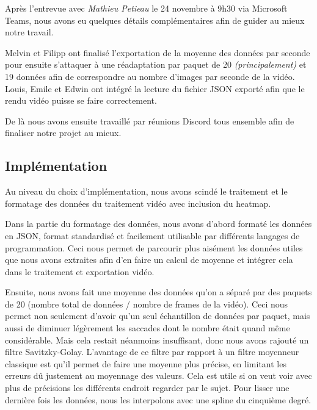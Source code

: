 \documentclass[12pt]{article}
\begin{document}
Après l'entrevue avec \emph{Mathieu Petieau} le 24 novembre à 9h30 via Microsoft Teams, nous avons eu quelques détails complémentaires afin de guider au mieux notre travail.

\hspace{0.3cm}

Melvin et Filipp ont finalisé l'exportation de la moyenne des données par seconde pour ensuite s'attaquer à une réadaptation par paquet de 20 \emph{(principalement)} et 19 données afin de correspondre au nombre d'images par seconde de la vidéo.
Louis, Emile et Edwin ont intégré la lecture du fichier JSON exporté afin que le rendu vidéo puisse se faire correctement.

\hspace{0.3cm}

De là nous avons ensuite travaillé par réunions Discord tous ensemble afin de finaliser notre projet au mieux.

\subsection{Implémentation}

Au niveau du choix d'implémentation, nous avons scindé le traitement et le formatage des données du traitement vidéo avec inclusion du heatmap.

\hspace{0.3cm}

Dans la partie du formatage des données, nous avons d'abord formaté les données en JSON, format standardisé et facilement utilisable par différents langages de programmation.
Ceci nous permet de parcourir plus aisément les données utiles que nous avons extraites afin d'en faire un calcul de moyenne et intégrer cela dans le traitement et exportation vidéo.

\hspace{0.3cm}

Ensuite, nous avons fait une moyenne des données qu'on a séparé par des paquets de 20 (nombre total de données / nombre de frames de la vidéo). Ceci nous permet non seulement d'avoir qu'un seul échantillon de données par paquet, mais aussi de diminuer légèrement les saccades dont le nombre était quand même considérable. Mais cela restait néanmoins insuffisant, donc nous avons rajouté un filtre Savitzky-Golay. L'avantage de ce filtre par rapport à un filtre moyenneur classique est qu'il permet de faire une moyenne plus précise, en limitant les erreurs dû justement au moyennage des valeurs. Cela est utile si on veut voir avec plus de précisions les différents endroit regarder par le sujet. Pour lisser une dernière fois les données, nous les interpolons avec une spline du cinquième degré. 
\end{document}
